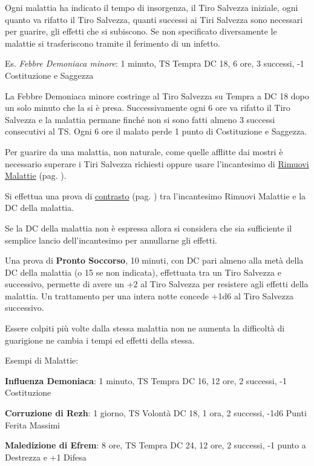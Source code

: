 \begin{multicols}{2}
Ogni malattia ha indicato il tempo di insorgenza, il Tiro Salvezza iniziale, ogni quanto va rifatto il Tiro Salvezza, quanti successi ai Tiri Salvezza sono necessari per guarire, gli effetti che si subiscono. Se non specificato diversamente le malattie si trasferiscono tramite il ferimento di un infetto.

Es. \emph{Febbre Demoniaca minore}: 1 minuto, TS Tempra DC 18, 6 ore, 3 successi, -1 Costituzione e Saggezza

La Febbre Demoniaca minore costringe al Tiro Salvezza su Tempra a DC 18 dopo un solo minuto che la si è presa. Successivamente ogni 6 ore va rifatto il Tiro Salvezza e la malattia permane finché non si sono fatti almeno 3 successi consecutivi al TS. Ogni 6 ore il malato perde 1 punto di Costituzione e Saggezza.

Per guarire da una malattia, non naturale, come quelle afflitte dai mostri è necessario superare i Tiri Salvezza richiesti oppure usare l'incantesimo di \hyperlink{rimuovimalattie}{Rimuovi Malattie} (pag. \pageref{rimuovimalattie}).

Si effettua una prova di \hyperlink{contrastareincantesimi}{contrasto} (pag. \pageref{contrastareincantesimi}) tra l'incantesimo Rimuovi Malattie e la DC della malattia.

Se la DC della malattia non è espressa allora si considera che sia sufficiente il semplice lancio dell'incantesimo per annullarne gli effetti.

Una prova di \textbf{Pronto Soccorso}, 10 minuti, con DC pari almeno alla metà della DC della malattia (o 15 se non indicata), effettuata tra un Tiro Salvezza e successivo, permette di avere un +2 al Tiro Salvezza per resistere agli effetti della malattia. Un trattamento per una intera notte concede +1d6 al Tiro Salvezza successivo.

Essere colpiti più volte dalla stessa malattia non ne aumenta la difficoltà di guarigione ne cambia i tempi ed effetti della stessa.

Esempi di Malattie:

\textbf{Influenza Demoniaca}: 1 minuto, TS Tempra DC 16, 12 ore, 2 successi, -1 Costituzione

\textbf{Corruzione di Rezh}: 1 giorno, TS Volontà DC 18, 1 ora, 2 successi, -1d6 Punti Ferita Massimi

\textbf{Maledizione di Efrem}: 8 ore, TS Tempra DC 24, 12 ore, 2 successi, -1 punto a Destrezza e +1 Difesa


\end{multicols}

